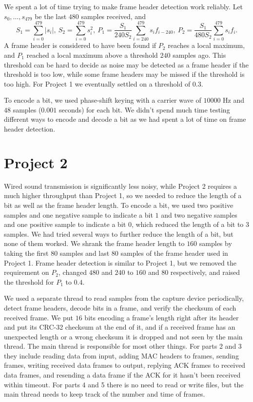 \documentclass{scrartcl}
\begin{document}
We spent a lot of time trying to make frame header detection work reliably. Let $s_0, \ldots, s_{479}$ be the last $480$ samples received, and
\begin{equation*}
  S_1 = \sum_{i = 0}^{479} \left\lvert s_i \right\rvert,\ S_2 = \sum_{i = 0}^{479} s_i^2,\ P_1 = \frac{S_1}{240 S_2} \sum_{i = 240}^{479} s_i f_{i - 240},\ P_2 = \frac{S_1}{480 S_2} \sum_{i = 0}^{479} s_i f_i.
\end{equation*}
A frame header is considered to have been found if $P_2$ reaches a local maximum, and $P_1$ reached a local maximum above a threshold $240$ samples ago. This threshold can be hard to decide as noise may be detected as a frame header if the threshold is too low, while some frame headers may be missed if the threshold is too high. For Project 1 we eventually settled on a threshold of $0.3$.

To encode a bit, we used phase-shift keying with a carrier wave of $10000$ Hz and $48$ samples ($0.001$ seconds) for each bit. We didn't spend much time testing different ways to encode and decode a bit as we had spent a lot of time on frame header detection.

\section*{Project 2}

Wired sound transmission is significantly less noisy, while Project 2 requires a much higher throughput than Project 1, so we needed to reduce the length of a bit as well as the frame header length. To encode a bit, we used two positive samples and one negative sample to indicate a bit $1$ and two negative samples and one positive sample to indicate a bit $0$, which reduced the length of a bit to $3$ samples. We had tried several ways to further reduce the length of a bit, but none of them worked. We shrank the frame header length to $160$ samples by taking the first $80$ samples and last $80$ samples of the frame header used in Project 1. Frame header detection is similar to Project 1, but we removed the requirement on $P_2$, changed $480$ and $240$ to $160$ and $80$ respectively, and raised the threshold for $P_1$ to $0.4$.

We used a separate thread to read samples from the capture device periodically, detect frame headers, decode bits in a frame, and verify the checksum of each received frame. We put $16$ bits encoding a frame's length right after its header and put its CRC-32 checksum at the end of it, and if a received frame has an unexpected length or a wrong checksum it is dropped and not seen by the main thread. The main thread is responsible for most other things. For parts 2 and 3 they include reading data from input, adding MAC headers to frames, sending frames, writing received data frames to output, replying ACK frames to received data frames, and resending a data frame if the ACK for it hasn't been received within timeout. For parts 4 and 5 there is no need to read or write files, but the main thread needs to keep track of the number and time of frames.
\end{document}
